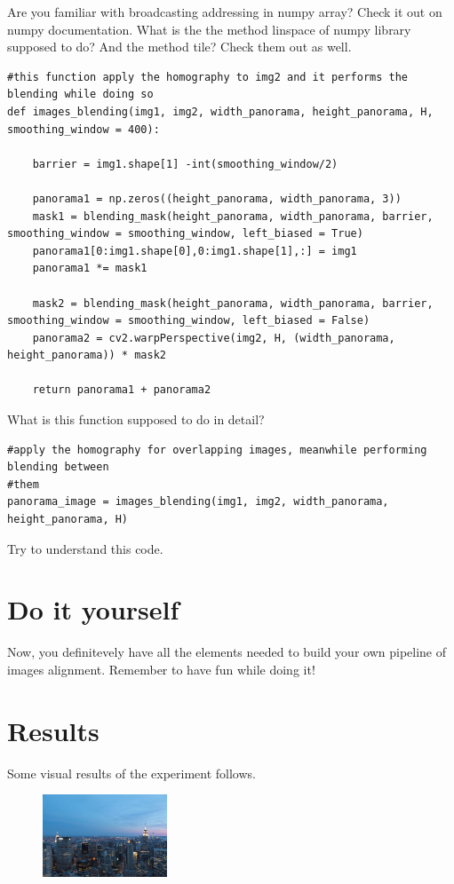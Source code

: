 \documentclass[aps,letterpaper,10pt]{revtex4}
\begin{document}
Are you familiar with broadcasting addressing in numpy array? Check it out on numpy documentation.
What is the the method linspace of numpy library supposed to do? And the method tile? Check them out as well.

\begin{lstlisting}
#this function apply the homography to img2 and it performs the blending while doing so
def images_blending(img1, img2, width_panorama, height_panorama, H, smoothing_window = 400):
    
    barrier = img1.shape[1] -int(smoothing_window/2)
    
    panorama1 = np.zeros((height_panorama, width_panorama, 3))
    mask1 = blending_mask(height_panorama, width_panorama, barrier, smoothing_window = smoothing_window, left_biased = True)
    panorama1[0:img1.shape[0],0:img1.shape[1],:] = img1
    panorama1 *= mask1
    
    mask2 = blending_mask(height_panorama, width_panorama, barrier, smoothing_window = smoothing_window, left_biased = False)
    panorama2 = cv2.warpPerspective(img2, H, (width_panorama, height_panorama)) * mask2
    
    return panorama1 + panorama2
\end{lstlisting}

What is this function supposed to do in detail?

\begin{lstlisting}
#apply the homography for overlapping images, meanwhile performing blending between
#them
panorama_image = images_blending(img1, img2, width_panorama, height_panorama, H)
\end{lstlisting}

Try to understand this code.

\section{Do it yourself}

Now, you definitevely have all the elements needed to build your own pipeline of images alignment. Remember to have fun while doing it! 

\newpage
\section{Results}
Some visual results of the experiment follows.

\begin{figure}[h]
	\begin{center}
		\includegraphics[width=0.33\textwidth]{imgs/rockfeller_1.JPG}
	\end{center}
\label{First view of New York skyline.}
\end{figure}
\end{document}
